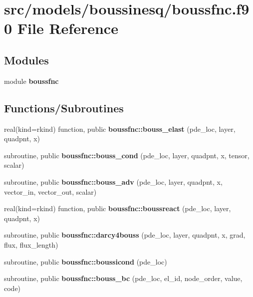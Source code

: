 \section{src/models/boussinesq/boussfnc.f90 File Reference}
\label{boussfnc_8f90}
\subsection*{Modules}
\begin{DoxyCompactItemize}
\item 
module {\bf boussfnc}
\end{DoxyCompactItemize}
\subsection*{Functions/\+Subroutines}
\begin{DoxyCompactItemize}
\item 
real(kind=rkind) function, public {\bf boussfnc\+::bouss\+\_\+elast} (pde\+\_\+loc, layer, quadpnt, x)
\item 
subroutine, public {\bf boussfnc\+::bouss\+\_\+cond} (pde\+\_\+loc, layer, quadpnt, x, tensor, scalar)
\item 
subroutine, public {\bf boussfnc\+::bouss\+\_\+adv} (pde\+\_\+loc, layer, quadpnt, x, vector\+\_\+in, vector\+\_\+out, scalar)
\item 
real(kind=rkind) function, public {\bf boussfnc\+::boussreact} (pde\+\_\+loc, layer, quadpnt, x)
\item 
subroutine, public {\bf boussfnc\+::darcy4bouss} (pde\+\_\+loc, layer, quadpnt, x, grad, flux, flux\+\_\+length)
\item 
subroutine, public {\bf boussfnc\+::boussicond} (pde\+\_\+loc)
\item 
subroutine, public {\bf boussfnc\+::bouss\+\_\+bc} (pde\+\_\+loc, el\+\_\+id, node\+\_\+order, value, code)
\end{DoxyCompactItemize}
